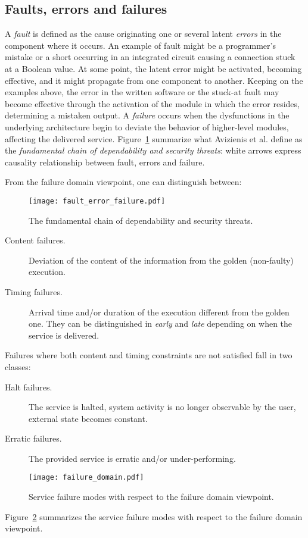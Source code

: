 \subsection{Faults, errors and failures}
A \emph{fault} is defined as the cause originating one or several latent \emph{errors} in the component where it occurs. An example of fault might be a programmer's mistake or a short occurring in an integrated circuit causing a connection stuck at a Boolean value. At some point, the latent error might be activated, becoming effective, and it might propagate from one component to another. Keeping on the examples above, the error in the written software or the stuck-at fault may become effective through the activation of the module in which the error resides, determining a mistaken output. A \emph{failure} occurs when the dysfunctions in the underlying architecture begin to deviate the behavior of higher-level modules, affecting the delivered service. Figure~\ref{fig:chain} summarize what Avizienis et al. \cite{1335465} define as the \emph{fundamental chain of dependability and security threats}: white arrows express causality relationship between fault, errors and failure. 

From the failure domain viewpoint, one can distinguish between:
\begin{figure}
    \centering
    \texttt{[image: fault\_error\_failure.pdf]}
    \caption{The fundamental chain of dependability and security threats.}
    \label{fig:chain}
\end{figure}
\begin{description}
    \item [Content failures.] Deviation of the content of the information from the golden (non-faulty) execution.
    \item [Timing failures.] Arrival time and/or duration of the execution different from the golden one. They can be distinguished in \emph{early} and \emph{late} depending on when the service is delivered.
\end{description}

Failures where both content and timing constraints are not satisfied fall in two classes:
\begin{description}
\item[Halt failures.] The service is halted, system activity is no longer observable by the user, external state becomes constant.
\item[Erratic failures.] The provided service is erratic and/or under-performing.
\end{description}
\begin{figure}[t]
    \centering
    \texttt{[image: failure\_domain.pdf]}
    \caption{Service failure modes with respect to the failure domain viewpoint.}
    \label{fig:failure_domain}
\end{figure}
Figure~\ref{fig:failure_domain} summarizes the service failure modes with respect to the failure domain viewpoint.


